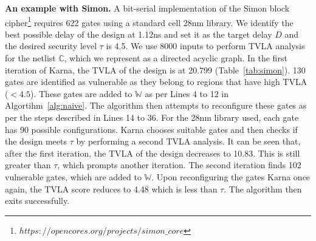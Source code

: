 {\flushleft \bf An example with Simon.} 
A bit-serial implementation of the Simon block cipher\footnote{$https://opencores.org/projects/simon\_core$} requires 622 gates using a standard cell 28nm library. We identify the best possible delay of the design at 1.12ns and set it as the target delay $D$   and the desired security level $\tau$ is 4.5. We use 8000 inputs to perform TVLA analysis for the netlist $\mathbb C$, which we represent as a directed acyclic graph. In the first iteration of {\sf Karna}, the TVLA of the design is at 20.799 (Table~\ref{tab:simon}). 130 gates are identified as vulnerable as they belong to regions that have high TVLA ($< 4.5$). These gates are added to $\mathbb W$ as per Lines 4 to 12 in Algortihm~\ref{alg:naive}. The algorithm then attempts to reconfigure these gates as per the steps described in Lines 14 to 36. For the 28nm library used, each gate has 90 possible configurations. {\sf Karna} chooses suitable gates and then checks if the design meets $\tau$ by performing a second TVLA analysis. It can be seen that, after the first iteration, the TVLA of the design decreases to 10.83. This is still greater than $\tau$, which prompts  another iteration. The second iteration finds 102 vulnerable gates, which are  added to $\mathbb W$. Upon reconfiguring the gates {\sf Karna} once again, the TVLA score reduces to 4.48 which is less than $\tau$. The algorithm then exits successfully. 

